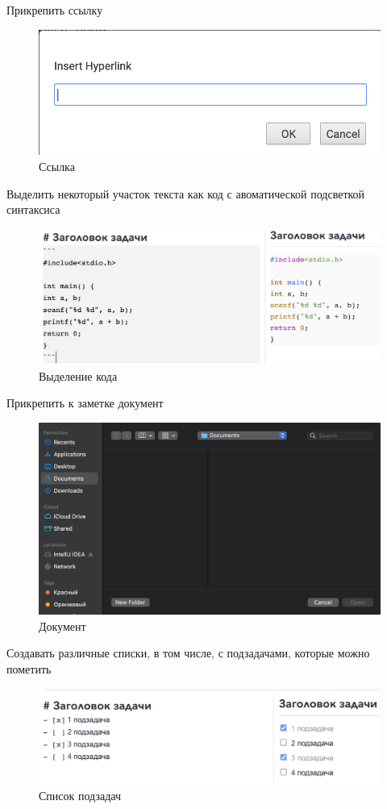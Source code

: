 \documentclass[12pt, a4paper]{article}
\begin{document}
    Прикрепить ссылку
    \begin{figure}[H]
        \centering
        \includegraphics[width=0.75\linewidth]{src/9.png}
        \caption{Ссылка}
    \end{figure}

    Выделить некоторый участок текста как код с авоматической подсветкой синтаксиса
    \begin{figure}[H]
        \centering
        \includegraphics[width=0.75\linewidth]{src/10.png}
        \caption{Выделение кода}
    \end{figure}

    Прикрепить к заметке документ
    \begin{figure}[H]
        \centering
        \includegraphics[width=0.75\linewidth]{src/11.png}
        \caption{Документ}
    \end{figure}

    Создавать различные списки, в том числе, с подзадачами, которые можно пометить
    \begin{figure}[H]
        \centering
        \includegraphics[width=0.75\linewidth]{src/12.png}
        \caption{Список подзадач}
    \end{figure}
\end{document}
